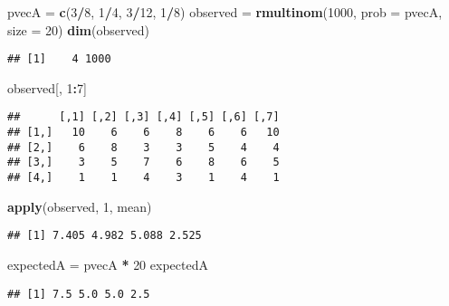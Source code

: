 \documentclass[]{article}
\newenvironment{Shaded}{\begin{snugshade}}{\end{snugshade}}
\newcommand{\KeywordTok}[1]{\textcolor[rgb]{0.13,0.29,0.53}{\textbf{#1}}}
\newcommand{\DataTypeTok}[1]{\textcolor[rgb]{0.13,0.29,0.53}{#1}}
\newcommand{\DecValTok}[1]{\textcolor[rgb]{0.00,0.00,0.81}{#1}}
\newcommand{\StringTok}[1]{\textcolor[rgb]{0.31,0.60,0.02}{#1}}
\newcommand{\OperatorTok}[1]{\textcolor[rgb]{0.81,0.36,0.00}{\textbf{#1}}}
\newcommand{\NormalTok}[1]{#1}
\begin{document}
\begin{Shaded}
\begin{Highlighting}[]
\NormalTok{pvecA =}\StringTok{ }\KeywordTok{c}\NormalTok{(}\DecValTok{3}\OperatorTok{/}\DecValTok{8}\NormalTok{, }\DecValTok{1}\OperatorTok{/}\DecValTok{4}\NormalTok{, }\DecValTok{3}\OperatorTok{/}\DecValTok{12}\NormalTok{, }\DecValTok{1}\OperatorTok{/}\DecValTok{8}\NormalTok{)}
\NormalTok{observed =}\StringTok{ }\KeywordTok{rmultinom}\NormalTok{(}\DecValTok{1000}\NormalTok{, }\DataTypeTok{prob =}\NormalTok{ pvecA, }\DataTypeTok{size =} \DecValTok{20}\NormalTok{)}
\KeywordTok{dim}\NormalTok{(observed)}
\end{Highlighting}
\end{Shaded}

\begin{verbatim}
## [1]    4 1000
\end{verbatim}

\begin{Shaded}
\begin{Highlighting}[]
\NormalTok{observed[, }\DecValTok{1}\OperatorTok{:}\DecValTok{7}\NormalTok{]}
\end{Highlighting}
\end{Shaded}

\begin{verbatim}
##      [,1] [,2] [,3] [,4] [,5] [,6] [,7]
## [1,]   10    6    6    8    6    6   10
## [2,]    6    8    3    3    5    4    4
## [3,]    3    5    7    6    8    6    5
## [4,]    1    1    4    3    1    4    1
\end{verbatim}

\begin{Shaded}
\begin{Highlighting}[]
\KeywordTok{apply}\NormalTok{(observed, }\DecValTok{1}\NormalTok{, mean)}
\end{Highlighting}
\end{Shaded}

\begin{verbatim}
## [1] 7.405 4.982 5.088 2.525
\end{verbatim}

\begin{Shaded}
\begin{Highlighting}[]
\NormalTok{expectedA =}\StringTok{ }\NormalTok{pvecA }\OperatorTok{*}\StringTok{ }\DecValTok{20}
\NormalTok{expectedA}
\end{Highlighting}
\end{Shaded}

\begin{verbatim}
## [1] 7.5 5.0 5.0 2.5
\end{verbatim}
\end{document}
